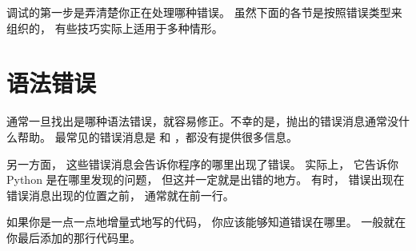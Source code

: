 
调试的第一步是弄清楚你正在处理哪种错误。  虽然下面的各节是按照错误类型来组织的， 有些技巧实际上适用于多种情形。

\section{语法错误}


通常一旦找出是哪种语法错误，就容易修正。不幸的是，抛出的错误消息通常没什么帮助。
最常见的错误消息是  和  ，都没有提供很多信息。


另一方面， 这些错误消息会告诉你程序的哪里出现了错误。
实际上， 它告诉你 Python 是在哪里发现的问题， 但这并一定就是出错的地方。
有时， 错误出现在错误消息出现的位置之前， 通常就在前一行。


如果你是一点一点地增量式地写的代码， 你应该能够知道错误在哪里。
一般就在你最后添加的那行代码里。


